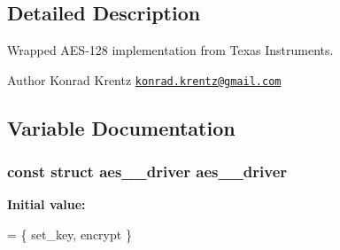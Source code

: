 \subsection{Detailed Description}
Wrapped A\+E\+S-\/128 implementation from Texas Instruments. \begin{DoxyAuthor}{Author}
Konrad Krentz \href{mailto:konrad.krentz@gmail.com}{\tt konrad.\+krentz@gmail.\+com} 
\end{DoxyAuthor}


\subsection{Variable Documentation}
\hypertarget{aes-128_8c_a905346d3c99808c6c0b98148a1a45ca8}{}
\subsubsection[{aes\+\_\+128\+\_\+driver}]{\setlength{\rightskip}{0pt plus 5cm}const struct {\bf aes\+\_\+\_\+driver} {\bf aes\+\_\+\_\+driver}}\label{aes-128_8c_a905346d3c99808c6c0b98148a1a45ca8}
{\bfseries Initial value\+:}
\begin{DoxyCode}
= \{
  set\_key,
  encrypt
\}
\end{DoxyCode}
